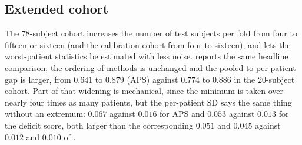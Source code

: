 


\subsection{Extended cohort}
\label{sec:results-cohort}

The 78-subject cohort increases the number of test subjects per fold from four
to fifteen or sixteen (and the calibration cohort from four to sixteen), and
lets the worst-patient statistics be estimated with
less noise.  reports the same headline comparison; the
ordering of methods is unchanged and the pooled-to-per-patient gap is larger,
from $0.641$ to $0.879$ (APS) against $0.774$ to $0.886$ in the 20-subject
cohort. Part of that widening is mechanical, since the minimum is taken over
nearly four times as many patients, but the per-patient SD says the same
thing without an extremum: $0.067$ against $0.016$ for APS and $0.053$
against $0.013$ for the deficit score, both larger than the corresponding
$0.051$ and $0.045$ against $0.012$ and $0.010$ of .


